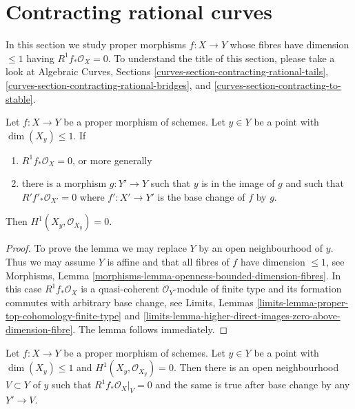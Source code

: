 \section{Contracting rational curves}
\label{section-contracting}

\noindent
In this section we study proper morphisms $f : X \to Y$ whose fibres
have dimension $\leq 1$ having $R^1f_*\mathcal{O}_X = 0$.
To understand the title of this section, please take a look at
Algebraic Curves, Sections
\ref{curves-section-contracting-rational-tails},
\ref{curves-section-contracting-rational-bridges}, and
\ref{curves-section-contracting-to-stable}.

\begin{lemma}
\label{lemma-check-h1-fibre-zero}
Let $f : X \to Y$ be a proper morphism of schemes. Let $y \in Y$
be a point with $\dim(X_y) \leq 1$. If
\begin{enumerate}
\item $R^1f_*\mathcal{O}_X = 0$, or more generally
\item there is a morphism $g : Y' \to Y$ such that $y$ is in the image
of $g$ and such that $R'f'_*\mathcal{O}_{X'} = 0$ where $f' : X' \to Y'$
is the base change of $f$ by $g$.
\end{enumerate}
Then $H^1(X_y, \mathcal{O}_{X_y}) = 0$.
\end{lemma}

\begin{proof}
To prove the lemma we may replace $Y$ by an open neighbourhood of $y$.
Thus we may assume $Y$ is affine
and that all fibres of $f$ have dimension $\leq 1$, see
Morphisms, Lemma \ref{morphisms-lemma-openness-bounded-dimension-fibres}.
In this case $R^1f_*\mathcal{O}_X$ is a quasi-coherent $\mathcal{O}_Y$-module
of finite type and its formation commutes with arbitrary base change, see
Limits, Lemmas \ref{limits-lemma-proper-top-cohomology-finite-type} and
\ref{limits-lemma-higher-direct-images-zero-above-dimension-fibre}.
The lemma follows immediately.
\end{proof}

\begin{lemma}
\label{lemma-h1-fibre-zero}
Let $f : X \to Y$ be a proper morphism of schemes. Let $y \in Y$
be a point with $\dim(X_y) \leq 1$ and $H^1(X_y, \mathcal{O}_{X_y}) = 0$.
Then there is an open neighbourhood $V \subset Y$ of $y$ such that
$R^1f_*\mathcal{O}_X|_V = 0$
and the same is true after base change by any $Y' \to V$.
\end{lemma}

